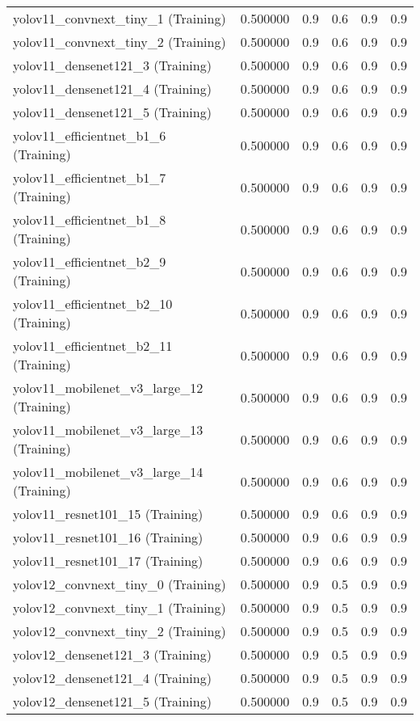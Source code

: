\begin{table}[h]
\begin{tabular}{lrllll}
yolov11_convnext_tiny_1 (Training) & 0.500000 & 0.9 & 0.6 & 0.9 & 0.9 \\
yolov11_convnext_tiny_2 (Training) & 0.500000 & 0.9 & 0.6 & 0.9 & 0.9 \\
yolov11_densenet121_3 (Training) & 0.500000 & 0.9 & 0.6 & 0.9 & 0.9 \\
yolov11_densenet121_4 (Training) & 0.500000 & 0.9 & 0.6 & 0.9 & 0.9 \\
yolov11_densenet121_5 (Training) & 0.500000 & 0.9 & 0.6 & 0.9 & 0.9 \\
yolov11_efficientnet_b1_6 (Training) & 0.500000 & 0.9 & 0.6 & 0.9 & 0.9 \\
yolov11_efficientnet_b1_7 (Training) & 0.500000 & 0.9 & 0.6 & 0.9 & 0.9 \\
yolov11_efficientnet_b1_8 (Training) & 0.500000 & 0.9 & 0.6 & 0.9 & 0.9 \\
yolov11_efficientnet_b2_9 (Training) & 0.500000 & 0.9 & 0.6 & 0.9 & 0.9 \\
yolov11_efficientnet_b2_10 (Training) & 0.500000 & 0.9 & 0.6 & 0.9 & 0.9 \\
yolov11_efficientnet_b2_11 (Training) & 0.500000 & 0.9 & 0.6 & 0.9 & 0.9 \\
yolov11_mobilenet_v3_large_12 (Training) & 0.500000 & 0.9 & 0.6 & 0.9 & 0.9 \\
yolov11_mobilenet_v3_large_13 (Training) & 0.500000 & 0.9 & 0.6 & 0.9 & 0.9 \\
yolov11_mobilenet_v3_large_14 (Training) & 0.500000 & 0.9 & 0.6 & 0.9 & 0.9 \\
yolov11_resnet101_15 (Training) & 0.500000 & 0.9 & 0.6 & 0.9 & 0.9 \\
yolov11_resnet101_16 (Training) & 0.500000 & 0.9 & 0.6 & 0.9 & 0.9 \\
yolov11_resnet101_17 (Training) & 0.500000 & 0.9 & 0.6 & 0.9 & 0.9 \\
yolov12_convnext_tiny_0 (Training) & 0.500000 & 0.9 & 0.5 & 0.9 & 0.9 \\
yolov12_convnext_tiny_1 (Training) & 0.500000 & 0.9 & 0.5 & 0.9 & 0.9 \\
yolov12_convnext_tiny_2 (Training) & 0.500000 & 0.9 & 0.5 & 0.9 & 0.9 \\
yolov12_densenet121_3 (Training) & 0.500000 & 0.9 & 0.5 & 0.9 & 0.9 \\
yolov12_densenet121_4 (Training) & 0.500000 & 0.9 & 0.5 & 0.9 & 0.9 \\
yolov12_densenet121_5 (Training) & 0.500000 & 0.9 & 0.5 & 0.9 & 0.9 \\

\end{tabular}
\end{table}
